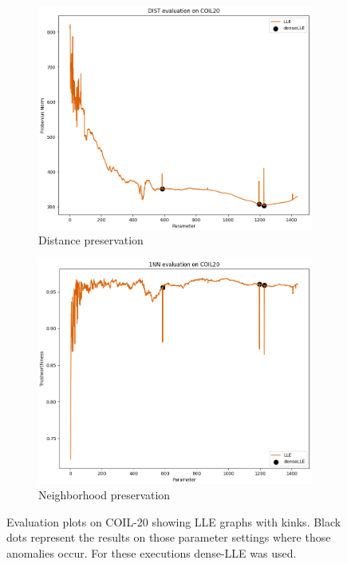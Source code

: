 \begin{figure}[!]
     \centering
     \begin{subfigure}[t]{0.49\columnwidth}
    	\centering
    	\includegraphics[width=\columnwidth]{images/dist_dense_coil20.png}
    	\caption{Distance preservation}
        \label{fig:dist_dense_coil20}
    \end{subfigure}
     \hfill
     \begin{subfigure}[t]{0.49\columnwidth}
    	\centering
    	\includegraphics[width=\columnwidth]{images/1NN_dense_plot.png}
    	\caption{Neighborhood preservation}
        \label{fig:1NN_dense_plot}
    \end{subfigure}
     \caption[Kinks in LLE's Graphs]{Evaluation plots on COIL-20 showing LLE graphs with kinks. Black dots represent the results on those parameter settings where those anomalies occur. For these executions dense-LLE was used.}
    \label{fig:kinks_lle}
\end{figure}

